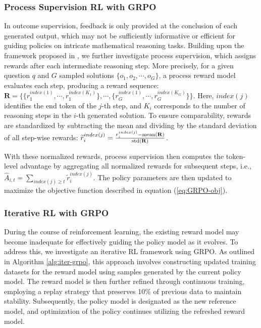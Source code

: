 \begin{itemize}[topsep=0pt]
\begin{itemize}[topsep=0pt]
\subsubsection{Process Supervision RL with GRPO}

In outcome supervision, feedback is only provided at the conclusion of each generated output, which may not be sufficiently informative or efficient for guiding policies on intricate mathematical reasoning tasks. Building upon the framework proposed in \cite{wang2023math}, we further investigate process supervision, which assigns rewards after each intermediate reasoning step. More precisely, for a given question $q$ and $G$ sampled solutions $\{o_1, o_2, \cdots, o_G\}$, a process reward model evaluates each step, producing a reward sequence: $\mathbf{R} = \{ \{r_1^{index(1)},\cdots,r_1^{index(K_1)}\}, \cdots,  \{r_G^{index(1)},\cdots,r_G^{index(K_G)}\} \}$. Here, $index(j)$ identifies the end token of the $j$-th step, and $K_i$ corresponds to the number of reasoning steps in the $i$-th generated solution. To ensure comparability, rewards are standardized by subtracting the mean and dividing by the standard deviation of all step-wise rewards: $\widetilde{r}_i^{index(j)} = \frac{r_i^{index(j)} - {\rm mean(\mathbf{R})}}{{\rm std(\mathbf{R})}}$.

With these normalized rewards, process supervision then computes the token-level advantage by aggregating all normalized rewards for subsequent steps, i.e., $\hat{A}_{i, t} = \sum_{index(j) \ge t} \widetilde{r}_i^{index(j)}$. The policy parameters are then updated to maximize the objective function described in equation (\ref{eq:GRPO-obj}).

\subsubsection{Iterative RL with GRPO} During the course of reinforcement learning, the existing reward model may become inadequate for effectively guiding the policy model as it evolves. To address this, we investigate an iterative RL framework using GRPO. As outlined in Algorithm \ref{alg:iter-grpo}, this approach involves constructing updated training datasets for the reward model using samples generated by the current policy model. The reward model is then further refined through continuous training, employing a replay strategy that preserves 10\% of previous data to maintain stability. Subsequently, the policy model is designated as the new reference model, and optimization of the policy continues utilizing the refreshed reward model.


\end{itemize}
\end{itemize}
